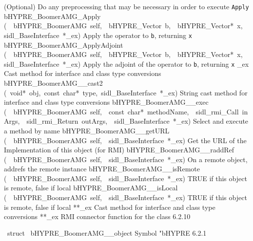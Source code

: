 \documentclass{article}
\begin{document}
\begin{cxxentry}
\begin{cxxentry}
\begin{cxxnames}
        {
(Optional) Do any preprocessing that may be necessary in
order to execute {\tt Apply}}
        {}
\label{cxx.6.2.28}
        {bHYPRE\_BoomerAMG\_Apply}
        {(\ \ bHYPRE\_BoomerAMG\ self,\ \ bHYPRE\_Vector\ b,\ \ bHYPRE\_Vector*\ x,\ \ sidl\_BaseInterface\ *\_ex)}
        {
Apply the operator to {\tt b}, returning {\tt x}}
        {}
\label{cxx.6.2.29}
        {bHYPRE\_BoomerAMG\_ApplyAdjoint}
        {(\ \ bHYPRE\_BoomerAMG\ self,\ \ bHYPRE\_Vector\ b,\ \ bHYPRE\_Vector*\ x,\ \ sidl\_BaseInterface\ *\_ex)}
        {
Apply the adjoint of the operator to {\tt b}, returning {\tt x}}
        {}
\label{cxx.6.2.30}
        {\_ex}
        {}
        {
Cast method for interface and class type conversions}
        {}
\label{cxx.6.2.31}
        {bHYPRE\_BoomerAMG\_\_cast2}
        {(\ void*\ obj,\ const\ char*\ type,\ sidl\_BaseInterface\ *\_ex)}
        {
String cast method for interface and class type conversions}
        {}
\label{cxx.6.2.32}
        {bHYPRE\_BoomerAMG\_\_exec}
        {(\ \ bHYPRE\_BoomerAMG\ self,\ \ const\ char*\ methodName,\ \ sidl\_rmi\_Call\ inArgs,\ \ sidl\_rmi\_Return\ outArgs,\ \ sidl\_BaseInterface\ *\_ex)}
        {
Select and execute a method by name}
        {}
\label{cxx.6.2.33}
        {bHYPRE\_BoomerAMG\_\_getURL}
        {(\ \ bHYPRE\_BoomerAMG\ self,\ \ sidl\_BaseInterface\ *\_ex)}
        {
Get the URL of the Implementation of this object (for RMI)}
        {}
\label{cxx.6.2.34}
        {bHYPRE\_BoomerAMG\_\_raddRef}
        {(\ \ bHYPRE\_BoomerAMG\ self,\ \ sidl\_BaseInterface\ *\_ex)}
        {
On a remote object, addrefs the remote instance}
        {}
\label{cxx.6.2.35}
        {bHYPRE\_BoomerAMG\_\_isRemote}
        {(\ \ bHYPRE\_BoomerAMG\ self,\ \ sidl\_BaseInterface\ *\_ex)}
        {
TRUE if this object is remote, false if local}
        {}
\label{cxx.6.2.36}
        {bHYPRE\_BoomerAMG\_\_isLocal}
        {(\ \ bHYPRE\_BoomerAMG\ self,\ \ sidl\_BaseInterface\ *\_ex)}
        {
TRUE if this object is remote, false if local}
        {}
\label{cxx.6.2.37}
        {**\_ex}
        {}
        {
Cast method for interface and class type conversions}
        {}
\label{cxx.6.2.38}
        {**\_ex}
        {}
        {
RMI connector function for the class}
        {6.2.10}
\end{cxxnames}
\begin{cxxvariable}
{\ struct\ }
        {bHYPRE\_BoomerAMG\_\_object}
        {}
        {
Symbol "bHYPRE}
        {6.2.1}
\begin{cxxdoc}


\end{cxxdoc}
\end{cxxvariable}
\end{cxxentry}
\end{cxxentry}
\end{document}
